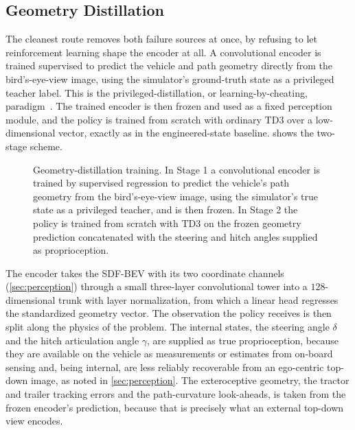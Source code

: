 \subsection{Geometry Distillation}
\label{sec:geometry_distillation}

The cleanest route removes both failure sources at once, by refusing to let reinforcement learning shape the encoder at all. A convolutional encoder is trained supervised to predict the vehicle and path geometry directly from the bird's-eye-view image, using the simulator's ground-truth state as a privileged teacher label. This is the privileged-distillation, or learning-by-cheating, paradigm~\cite{chen2020cheating}. The trained encoder is then frozen and used as a fixed perception module, and the policy is trained from scratch with ordinary TD3 over a low-dimensional vector, exactly as in the engineered-state baseline.  shows the two-stage scheme.

\begin{figure}[t]
  \centering
  \resizebox{\textwidth}{!}{}
  \caption{Geometry-distillation training. In Stage 1 a convolutional encoder is trained by supervised regression to predict the vehicle's path geometry from the bird's-eye-view image, using the simulator's true state as a privileged teacher, and is then frozen. In Stage 2 the policy is trained from scratch with TD3 on the frozen geometry prediction concatenated with the steering and hitch angles supplied as proprioception.}
  \label{fig:geometry_distillation}
\end{figure}

The encoder takes the SDF-BEV with its two coordinate channels (\cref{sec:perception}) through a small three-layer convolutional tower into a $128$-dimensional trunk with layer normalization, from which a linear head regresses the standardized geometry vector. The observation the policy receives is then split along the physics of the problem. The internal states, the steering angle $\delta$ and the hitch articulation angle $\gamma$, are supplied as true proprioception, because they are available on the vehicle as measurements or estimates from on-board sensing and, being internal, are less reliably recoverable from an ego-centric top-down image, as noted in \cref{sec:perception}. The exteroceptive geometry, the tractor and trailer tracking errors and the path-curvature look-aheads, is taken from the frozen encoder's prediction, because that is precisely what an external top-down view encodes.

